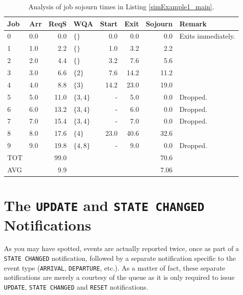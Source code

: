 \documentclass[12pt]{book}
\begin{document}
\begin{table}[h]
\caption{Analysis of job sojourn times in Listing \ref{simExample1_main}.}
\label{simExample1_analysis}
\begin{center}
\begin{tabular}{|l|l|r|l|r|r|r|l|}
\hline
Job & Arr & ReqS & WQA & Start & Exit & Sojourn & Remark \\
\hline
\hline
0 & 0.0 &  0.0 & $\{      \}$ & 0.0  &  0.0 &  0.0 & Exits immediately. \\ \hline
1 & 1.0 &  2.2 & $\{      \}$ & 1.0  &  3.2 &  2.2 &                    \\ \hline
2 & 2.0 &  4.4 & $\{      \}$ & 3.2  &  7.6 &  5.6 &                    \\ \hline
3 & 3.0 &  6.6 & $\{ 2    \}$ & 7.6  & 14.2 & 11.2 &                    \\ \hline
4 & 4.0 &  8.8 & $\{ 3    \}$ & 14.2 & 23.0 & 19.0 &                    \\ \hline
5 & 5.0 & 11.0 & $\{ 3, 4 \}$ & -    &  5.0 &  0.0 & Dropped.           \\ \hline
6 & 6.0 & 13.2 & $\{ 3, 4 \}$ & -    &  6.0 &  0.0 & Dropped.           \\ \hline
7 & 7.0 & 15.4 & $\{ 3, 4 \}$ & -    &  7.0 &  0.0 & Dropped.           \\ \hline
8 & 8.0 & 17.6 & $\{ 4    \}$ & 23.0 & 40.6 & 32.6 &                    \\ \hline
9 & 9.0 & 19.8 & $\{ 4, 8 \}$ & -    &  9.0 &  0.0 & Dropped.           \\ \hline
\hline
TOT   & & 99.0 &              &      &      & 70.6 &                    \\ \hline
\hline
AVG   & &  9.9 &              &      &      & 7.06 &                    \\ \hline
\hline
\end{tabular}
\end{center}
\end{table}

\section{The \texttt{UPDATE} and \texttt{STATE CHANGED} Notifications}

As you may have spotted,
  events are actually reported twice,
  once as part of a \lstinline|STATE CHANGED| notification,
  followed by a separate notification specific to the event type
  (\lstinline-ARRIVAL-, \lstinline-DEPARTURE-, etc.).
As a matter of fact, these separate notifications are merely a courtesy
  of the queue as it is only required to issue
  \lstinline|UPDATE|, \lstinline|STATE CHANGED| and \lstinline|RESET| notifications.
\end{document}
